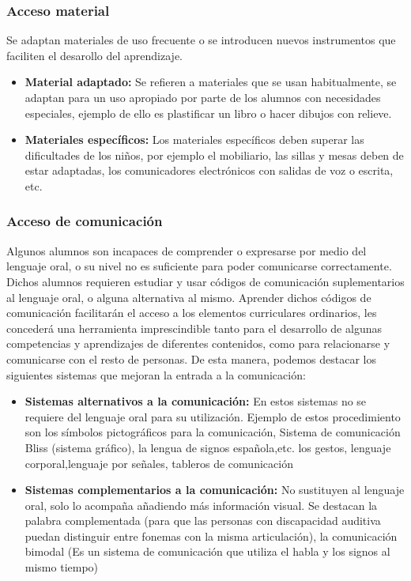 \subsubsection{Acceso material}
Se adaptan materiales de uso frecuente o se introducen nuevos instrumentos que faciliten el desarollo del aprendizaje.
\begin{itemize}
    \item \textbf{Material adaptado:} Se refieren a materiales que se usan habitualmente, se adaptan para un uso apropiado por parte de los alumnos con necesidades especiales, ejemplo de ello es plastificar un libro o hacer dibujos con relieve.
    \item \textbf{Materiales específicos:} Los materiales específicos deben superar las dificultades de los niños, por ejemplo el mobiliario, las sillas y mesas deben de estar adaptadas, los comunicadores electrónicos con salidas de voz o escrita, etc.
\end{itemize}

\subsubsection{Acceso de comunicación}
Algunos alumnos son incapaces de comprender o expresarse por medio del lenguaje oral, o su nivel no es suficiente para poder comunicarse correctamente. Dichos alumnos requieren estudiar y usar códigos de comunicación suplementarios al lenguaje oral, o alguna alternativa al mismo. Aprender dichos códigos de comunicación facilitarán el acceso a los elementos curriculares ordinarios, les concederá una herramienta imprescindible tanto para el desarrollo de algunas competencias y aprendizajes de diferentes contenidos, como para relacionarse y comunicarse con el resto de personas. De esta manera, podemos destacar los siguientes sistemas que mejoran la  entrada a la comunicación:
\begin{itemize}
    \item \textbf{Sistemas alternativos a la comunicación:} En estos sistemas no se requiere del lenguaje oral para su utilización. Ejemplo de estos procedimiento son los símbolos pictográficos para la comunicación, Sistema de comunicación Bliss (sistema gráfico), la lengua de signos española,etc.
    los gestos, lenguaje corporal,lenguaje por señales, tableros de comunicación
   
    \item \textbf{Sistemas complementarios a la comunicación:} No sustituyen al lenguaje oral, solo lo acompaña añadiendo más información visual. Se destacan la palabra complementada (para que las personas con discapacidad auditiva puedan distinguir entre fonemas con la misma articulación), la comunicación bimodal (Es un sistema de comunicación que utiliza el habla y los signos al mismo tiempo)
\end{itemize}

